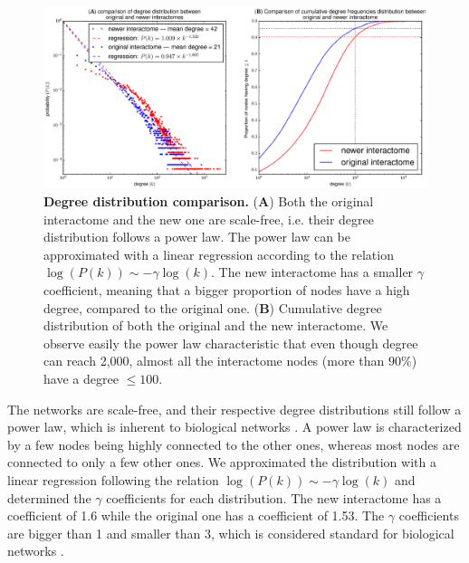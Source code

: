 \documentclass[letterpaper]{article}
\begin{document}
	\begin{figure}[!t]
		\hspace{-1.9cm}
		\vspace{-.6cm}
		\includegraphics[scale=.475]{images/degree_distributions_comparison.eps}
		\caption{{\bf Degree distribution comparison.} ({\bf A})  Both the original interactome and the new one
		are scale-free, i.e. their degree distribution follows a power law. The power law can be approximated
		with a linear regression according to the relation $\log(P(k)) \sim -\gamma\log(k)$. The new interactome
		has a smaller $\gamma$ coefficient, meaning that a bigger proportion of nodes have a high degree,
		compared to the original one.
		({\bf B}) Cumulative degree distribution of both the original and the new interactome. We observe
		easily the power law characteristic that even though degree can reach 2,000, almost all the interactome
		nodes (more than $90\%$) have a degree $\leq 100$.
		\label{fig:degree distribution comparison}}
		\vspace{-.45cm}
	\end{figure}

	The networks are scale-free, and their respective degree distributions still follow a power law, which is
	inherent to biological networks \cite{vidal2011interactome}. A power law is characterized by a few nodes
	being highly connected to the other ones, whereas most nodes are connected to only a few other ones. We
	approximated the distribution with a linear regression following the relation $\log(P(k)) \sim -\gamma\log(k)$
	and determined the $\gamma$ coefficients for each distribution. The new interactome has a coefficient of
	1.6 while the original one has a coefficient of 1.53. The $\gamma$ coefficients are bigger than 1 and
	smaller than 3, which is considered standard for biological networks
	\citep{UnderstandingTheCellFunctionalOrganization,vidal2011interactome}.
\end{document}
